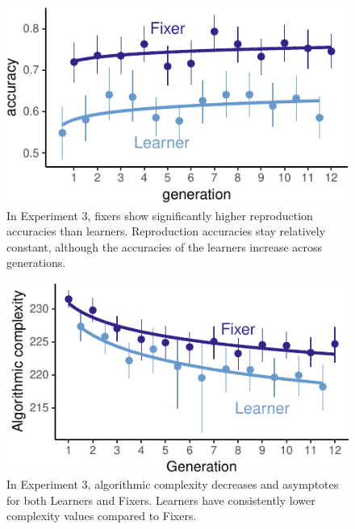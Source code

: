 \documentclass[10pt, letterpaper]{article}
\newenvironment{CodeChunk}{}{}
\begin{document}
\begin{CodeChunk}
\begin{figure}[tb]

{\centering \includegraphics{figs/dyad_accuracy-1} 

}

\caption[In Experiment 3, fixers show significantly higher reproduction accuracies than learners]{In Experiment 3, fixers show significantly higher reproduction accuracies than learners. Reproduction accuracies stay relatively constant, although the accuracies of the learners increase across generations.}\label{fig:dyad_accuracy}
\end{figure}
\end{CodeChunk}

\begin{CodeChunk}
\begin{figure}[tb]

{\centering \includegraphics{figs/e3_complexity_condition-1} 

}

\caption[In Experiment 3, algorithmic complexity decreases and asymptotes for both Learners and Fixers]{In Experiment 3, algorithmic complexity decreases and asymptotes for both Learners and Fixers. Learners have consistently lower complexity values compared to Fixers.}\label{fig:e3_complexity_condition}
\end{figure}
\end{CodeChunk}
\end{document}
